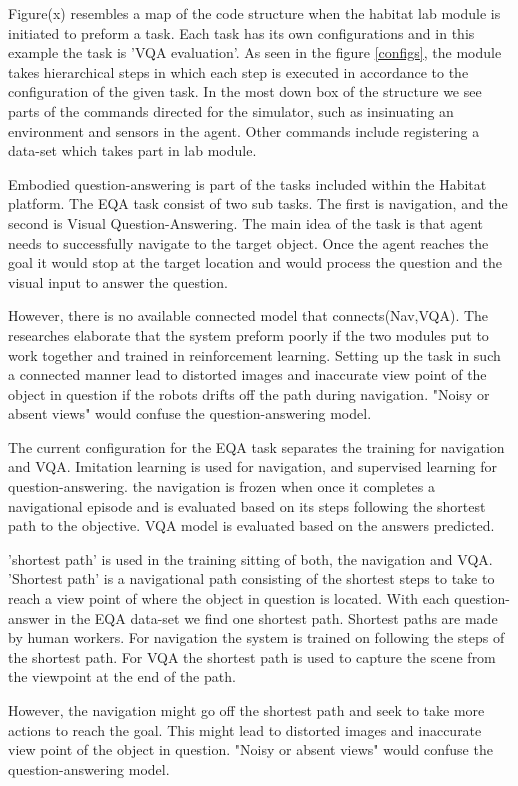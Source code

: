 Figure(x) resembles a map of the code structure when the habitat lab module is initiated to preform a task. Each task has its own configurations and in this example the task is 'VQA evaluation'. As seen in the figure \ref{configs}, the module takes hierarchical steps in which each step is executed in accordance to the configuration of the given task. In the most down box of the structure we see parts of the commands directed for the simulator, such as insinuating an environment and sensors in the agent. Other commands include registering a data-set which takes part in lab module. 


Embodied question-answering is part of the tasks included within the Habitat platform. The EQA task consist of two sub tasks. The first is navigation, and the second is Visual Question-Answering. The main idea of the task is that agent needs to successfully navigate to the target object. Once the agent reaches the goal it would stop at the target location and would process the question and the visual input to answer the question. 


However, there is no available connected model that connects(Nav,VQA). The researches elaborate that the system preform poorly if the two modules put to work together and trained in reinforcement learning. Setting up the task in such a connected manner lead to distorted images and inaccurate view point of the object in question if the robots drifts off the path during navigation. "Noisy or absent views"  would confuse the question-answering model.

The current configuration for the EQA task separates the training for navigation and VQA. Imitation learning is used for navigation, and supervised learning for question-answering. the navigation is frozen when once it completes a navigational episode and is evaluated based on its steps following the shortest path to the objective. VQA model is evaluated based on the answers predicted.  

'shortest path' is used in the training sitting of both, the navigation and VQA. 'Shortest path' is a navigational path consisting of the shortest steps to take to reach a view point of where the object in question is located. With each question-answer in the EQA data-set we find one shortest path. Shortest paths are made by human workers. For navigation the system is trained on following the steps of the shortest path. For VQA the shortest path is used to capture the scene from the viewpoint at the end of the path.  

However, the navigation might go off the shortest path and seek to take more actions to reach the goal. This might lead to distorted images and inaccurate view point of the object in question. "Noisy or absent views"  would confuse the question-answering model.

